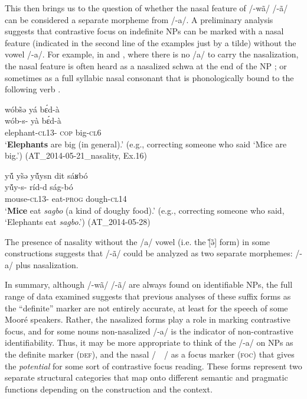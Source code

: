 \documentclass[output=paper]{langsci/langscibook}
\begin{document}
This then brings us to the question of whether the nasal feature of /-wã/ {\Tilde} /-ã/ can be considered a separate morpheme from /-a/. A preliminary analysis suggests that contrastive focus on indefinite NPs can be marked with a nasal feature (indicated in the second line of the examples just by a tilde) without the vowel /-a/. For example, in  and , where there is no /a/ to carry the nasalization, the nasal feature is often heard as a nasalized schwa at the end of the NP ; or sometimes as a full syllabic nasal consonant that is phonologically bound to the following verb .

\ea\label{ex:teo:55}
\glll wóbs̃ə yá b\'ɛd-à\\
wób-s-\textsuperscript{{\Tilde}}  yà b\'ɛd-à\\
elephant-\textsc{cl13}-\textsuperscript{{\Tilde}}  \textsc{cop} big-\textsc{cl6}\\
\glt ‘\textbf{Elephants} are big (in general).’ (e.g., correcting someone who said ‘Mice are big.’) (AT\_2014-05-21\_nasality, Ex.16)
\z

\ea\label{ex:teo:56}
\glll y\'{ũ} ys̃ə {\Tilde}y\'{ũ}ysn dit sáʁbó\\
y\'ũy-s-\textsuperscript{{\Tilde}}  ríd-d{\rmfnm} ság-bó\\
mouse-\textsc{cl}13-\textsuperscript{{\Tilde}} eat-\textsc{prog} dough-\textsc{cl14}\\
\glt ‘\textbf{Mice} eat \textit{sagbo} (a kind of doughy food).’ (e.g., correcting someone who said, ‘Elephants eat \textit{sagbo}.’) (AT\_2014-05-28)
\z
{}

The presence of nasality without the /a/ vowel (i.e. the [̃ə̃] form) in some constructions suggests that /-ã/ could be analyzed as two separate morphemes: /-a/ plus nasalization.


In summary, although /-wã/ {\Tilde} /-ã/ are always found on identifiable NPs, the full range of data examined suggests that previous analyses of these suffix forms as the “definite” marker are not entirely accurate, at least for the speech of some Mooré speakers. Rather, the nasalized forms play a role in marking contrastive focus, and for some nouns non-nasalized /-a/ is the indicator of non-contrastive identifiability. Thus, it may be more appropriate to think of the /-a/ on NPs as the definite marker (\textsc{def}), and the nasal /~{\Tilde}~/ as a focus marker (\textsc{foc}) that gives the \textit{potential} for some sort of contrastive focus reading. These forms represent two separate structural categories that map onto different semantic and pragmatic functions depending on the construction and the context.
\end{document}
